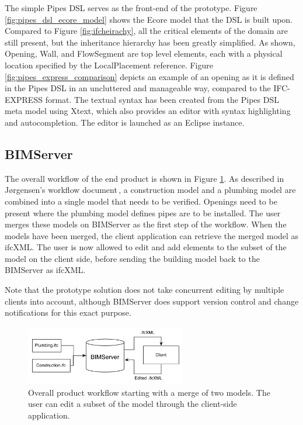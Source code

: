 The simple Pipes DSL serves as the front-end of the prototype. Figure \ref{fig:pipes_dsl_ecore_model} shows the Ecore model that the DSL is built upon. Compared to Figure \ref{fig:ifcheirachy}, all the critical elements of the domain are still present, but the inheritance hierarchy has been greatly simplified. As shown, Opening, Wall, and FlowSegment are top level elements, each with a physical location specified by the LocalPlacement reference. Figure \ref{fig:pipes_express_comparison} depicts an example of an opening as it is defined in the Pipes DSL in an uncluttered and manageable way, compared to the IFC-EXPRESS format. The textual syntax has been created from the Pipes DSL meta model using Xtext, which also provides an editor with syntax highlighting and autocompletion. The editor is launched as an Eclipse instance.

\subsection{BIMServer}
The overall workflow of the end product is shown in Figure \ref{fig:overall_product_workflow}. As described in J\o rgensen's workflow document\,\cite{jorgensen12}, a construction model and a plumbing model are combined into a single model that needs to be verified. Openings need to be present where the plumbing model defines pipes are to be installed. The user merges these models on BIMServer as the first step of the workflow. When the models have been merged, the client application can retrieve the merged model as ifcXML. The user is now allowed to edit and add elements to the subset of the model on the client side, before sending the building model back to the BIMServer as ifcXML.

Note that the prototype solution does not take concurrent editing by multiple clients into account, although BIMServer does support version control and change notifications for this exact purpose.

\begin{figure}[t]
    \centering
        \includegraphics[width=70mm]{images/CompleteWorkflow.pdf}
    \caption{Overall product workflow starting with a merge of two models. The user can edit a subset of the model through the client-side application.}
    \label{fig:overall_product_workflow}
\end{figure}

